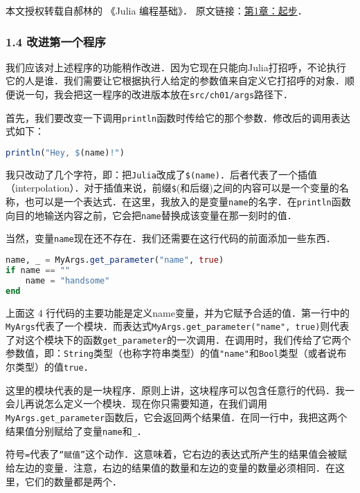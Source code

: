 
本文授权转载自郝林的 《Julia 编程基础》． 原文链接：\href{https://github.com/hyper0x/JuliaBasics/blob/master/book/ch01.md}{第1章：起步}．


\subsubsection{1.4 改进第一个程序}

我们应该对上述程序的功能稍作改进．因为它现在只能向Julia打招呼，不论执行它的人是谁．我们需要让它根据执行人给定的参数值来自定义它打招呼的对象．顺便说一句，我会把这一程序的改进版本放在\verb|src/ch01/args|路径下．

首先，我们要改变一下调用\verb|println|函数时传给它的那个参数．修改后的调用表达式如下：
\begin{lstlisting}[language=julia]
println("Hey, $(name)!")
\end{lstlisting}

我只改动了几个字符，即：把\verb|Julia|改成了\verb|$(name)|．后者代表了一个插值（interpolation）．对于插值来说，前缀\verb|$|(和后缀)之间的内容可以是一个变量的名称，也可以是一个表达式．在这里，我放入的是变量\verb|name|的名字．在\verb|println|函数向目的地输送内容之前，它会把\verb|name|替换成该变量在那一刻时的值．

当然，变量\verb|name|现在还不存在．我们还需要在这行代码的前面添加一些东西．

\begin{lstlisting}[language=julia]
name, _ = MyArgs.get_parameter("name", true)
if name == "" 
    name = "handsome" 
end
\end{lstlisting}

上面这 4 行代码的主要功能是定义name变量，并为它赋予合适的值．第一行中的\verb|MyArgs|代表了一个模块．而表达式\verb|MyArgs.get_parameter("name", true)|则代表了对这个模块下的函数\verb|get_parameter|的一次调用．在调用时，我们传给了它两个参数值，即：\verb|String|类型（也称字符串类型）的值\verb|"name"|和\verb|Bool|类型（或者说布尔类型）的值\verb|true|．

这里的模块代表的是一块程序．原则上讲，这块程序可以包含任意行的代码．我一会儿再说怎么定义一个模块．现在你只需要知道，在我们调用\verb|MyArgs.get_parameter|函数后，它会返回两个结果值．在同一行中，我把这两个结果值分别赋给了变量\verb|name|和\verb|_|．

符号\verb|=|代表了\verb|“赋值”|这个动作．这意味着，它右边的表达式所产生的结果值会被赋给左边的变量．注意，右边的结果值的数量和左边的变量的数量必须相同．在这里，它们的数量都是两个．

